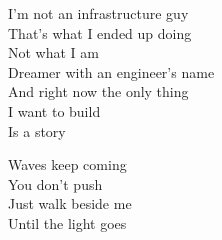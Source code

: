 \begin{lyrics}
I’m not an infrastructure guy\\
That’s what I ended up doing\\
Not what I am\\
Dreamer with an engineer’s name\\
And right now the only thing\\
I want to build\\
Is a story

Waves keep coming\\
You don’t push\\
Just walk beside me\\
Until the light goes
\end{lyrics}

